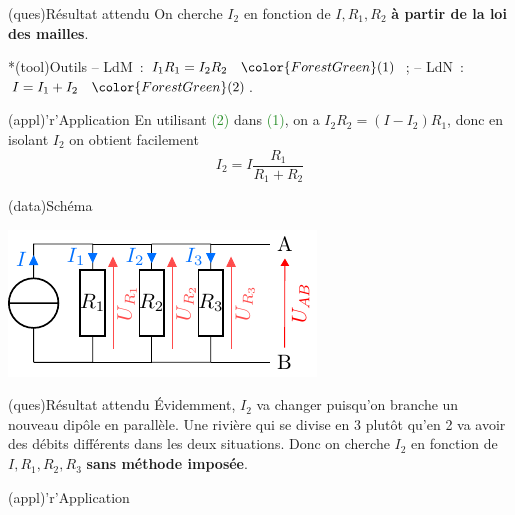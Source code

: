 \documentclass[../../main/main.tex]{subfiles}
\begin{document}
{\begin{tcbraster}[raster columns=3, raster equal height=rows]
    \begin{tcb}(ques){Résultat attendu}
        On cherche $I_2$ en fonction de $I, R_1, R_2$ \textbf{à partir de la loi
        des mailles}.
    \end{tcb}
    \begin{tcb}*(tool){Outils}
        -- LdM~: $I_1R_1 = I_2R_2 \quad \color{ForestGreen}(1)$~;
        \smallbreak
        -- LdN~: $I = I_1 + I_2 \quad \color{ForestGreen}(2)$.
    \end{tcb}
    \begin{tcb}(appl)'r'{Application}
        En utilisant \textcolor{ForestGreen}{(2)} dans
        \textcolor{ForestGreen}{(1)}, on a $I_2R_2 = (I-I_2)R_1$, donc en
        isolant $I_2$ on obtient facilement \[\boxed{I_2 = I
        \frac{R_1}{R_1+R_2}}\]
    \end{tcb}
\end{tcbraster}
\begin{tcbraster}[raster columns=7, raster equal height=rows]
    \begin{tcolorbox}[blankest, raster multicolumn=4, space to=\myspace]
        \begin{tcbraster}[raster columns=1]
    \begin{tcb}(data){Schéma}
        \begin{center}
            \includegraphics{divcour_3}
        \end{center}
    \end{tcb}
    \begin{tcb}(ques){Résultat attendu}
        Évidemment, $I_2$ va changer puisqu'on branche un nouveau dipôle en
        parallèle. Une rivière qui se divise en 3 plutôt qu'en 2 va avoir des
        débits différents dans les deux situations. Donc on cherche $I_2$ en
        fonction de $I, R_1, R_2, R_3$ \textbf{sans méthode imposée}.
    \end{tcb}
        \end{tcbraster}
    \end{tcolorbox}
    \begin{tcb}[raster multicolumn=3](appl)'r'{Application}

\end{tcb}
\end{tcbraster}}
\end{document}
